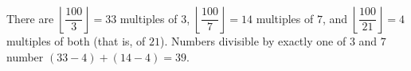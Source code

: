 There are $\left\lfloor\dfrac{100}3\right\rfloor=33$ multiples of $3$, $\left\lfloor\dfrac{100}7\right\rfloor=14$ multiples of $7$, and $\left\lfloor\dfrac{100}{21}\right\rfloor=4$ multiples of both (that is, of $21$). Numbers divisible by exactly one of $3$ and $7$ number $(33-4)+(14-4)=\boxed{39}$.
